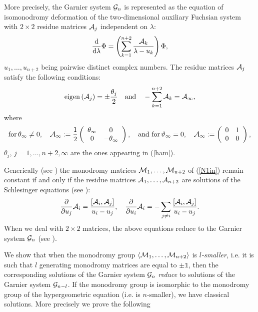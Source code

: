 \documentclass[12pt]{article}
\def\thi{{\vartheta_\infty}}
\newcommand{\ID}{\mathbb{1}}
\theoremstyle{definition}
\theoremstyle{theorem}
\begin{document}
More precisely, the Garnier system ${\cal G}_n$ is represented as 
the equation of isomonodromy deformation of the two-dimensional
auxiliary Fuchsian system with $2\times 2$ residue matrices 
${\cal A}_j$ independent on $\lambda$:
\begin{equation}
{{\rm d}\over{\rm d}\lambda} \Phi=\left(
\sum_{k=1}^{n+2}{{\cal A}_k\over \lambda-u_k} \right)\Phi,
\label{N1in}
\end{equation}
$u_1,\dots,u_{n+2}$ being pairwise distinct complex numbers. 
The residue matrices ${\cal A}_j$ satisfy the following conditions:
$$
{\rm eigen}\left({\cal A}_j\right)=\pm{\theta_j\over2}
\quad\hbox{and}\quad
-\sum_{k=1}^{n+2}{\cal A}_k={\cal A}_\infty,
$$
where
$$
\hbox{for}\,\theta_\infty\neq 0,\quad
{\cal A}_\infty:={1\over2}\left(
\begin{array}{cc}
\theta_\infty & 0\\ 0 & -\theta_\infty\\
\end{array}\right),
\quad\hbox{and for}\,\thi=0,
\quad  
{\cal A}_\infty:=\left(
\begin{array}{cc}0& 1\\ 0 & 0\\\end{array}\right),
$$
$\theta_j$, $j=1,\dots,n+2,\infty$ are the ones appearing in (\ref{ham}).

Generically (see \cite{Bol}) the monodromy matrices 
${\cal M}_1,\dots,{\cal M}_{n+2}$ 
of (\ref{N1in}) remain constant if and only if the residue matrices 
${\cal A}_1,\dots,{\cal A}_{n+2}$ are solutions of the Schlesinger
equations (see \cite{Sch}):
\begin{equation}
{\partial\over\partial u_j} {\cal A}_i= 
{[ {\cal A}_i, {\cal A}_j]\over u_i-u_j},\quad
{\partial\over\partial u_i} {\cal A}_i= 
-\sum_{j\neq i}{[ {\cal A}_i, {\cal A}_j]\over u_i-u_j}. 
\label{schleq}\end{equation}
When we deal with $2\times 2$ matrices, the above equations reduce 
to the Garnier system ${\cal G}_n$ (see \cite{Gar1,Gar2,IKSY}).

We show that when the  monodromy group 
$\langle{\cal M}_1,\dots,{\cal M}_{n+2}\rangle$ is 
{\it $l$-smaller,}\/ i.e. it is such that $l$ generating monodromy 
matrices are equal to $\pm\ID$, then 
the corresponding solutions of the Garnier system ${\cal G}_n$
{\it reduce}\/ to solutions of the Garnier system ${\cal G}_{n-l}$.
If the monodromy group is isomorphic to the monodromy group of the 
hypergeometric equation (i.e. is $n$-smaller), we have classical 
solutions. More precisely we prove the following
\end{document}
